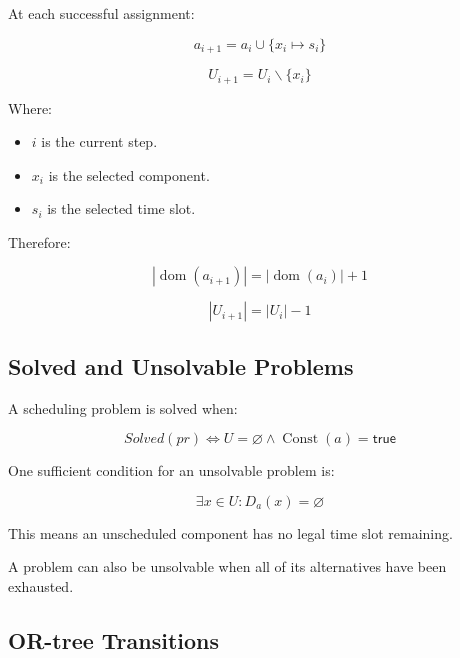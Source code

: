 \documentclass[11pt,letterpaper]{article}
\newcommand{\setminusop}{\mathbin{\backslash}}
\newcommand{\Const}{\operatorname{Const}}
\newcommand{\dom}{\operatorname{dom}}
\begin{document}
At each successful assignment:

\begin{equation}
\boxed{
a_{i+1}=
a_i\cup\{x_i\mapsto s_i\}
}
\end{equation}

\begin{equation}
\boxed{
U_{i+1}=
U_i\setminusop\{x_i\}
}
\end{equation}

Where:

\begin{itemize}
    \item $i$ is the current step.
    \item $x_i$ is the selected component.
    \item $s_i$ is the selected time slot.
\end{itemize}

Therefore:

\begin{equation}
|\dom(a_{i+1})|=|\dom(a_i)|+1
\end{equation}

\begin{equation}
|U_{i+1}|=|U_i|-1
\end{equation}

\subsection{Solved and Unsolvable Problems}

A scheduling problem is solved when:

\begin{equation}
\boxed{
Solved(pr)
\iff
U=\varnothing
\land
\Const(a)=\mathsf{true}
}
\end{equation}

One sufficient condition for an
unsolvable problem is:

\begin{equation}
\boxed{
\exists x\in U:
D_a(x)=\varnothing
}
\end{equation}

This means an unscheduled component
has no legal time slot remaining.

A problem can also be unsolvable when all
of its alternatives have been exhausted.

\subsection{OR-tree Transitions}
\end{document}
